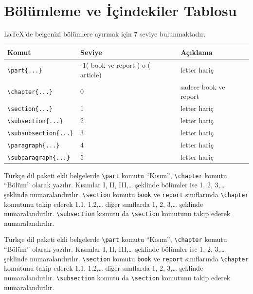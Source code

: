 \documentclass[
  10pt,
]{scrbook}
\theoremstyle{definition}
\theoremstyle{definition}
\theoremstyle{definition}
\theoremstyle{definition}
\theoremstyle{remark}
\begin{document}
\hypertarget{buxf6luxfcmleme-ve-iuxe7indekiler-tablosu}{%
\section{Bölümleme ve İçindekiler Tablosu}\label{buxf6luxfcmleme-ve-iuxe7indekiler-tablosu}}

LaTeX'de belgenizi bölümlere ayırmak için 7 seviye bulunmaktadır.

\begin{longtable}[]{@{}lll@{}}
\toprule
Komut & Seviye & Açıklama \\
\midrule
\endhead
\texttt{\textbackslash{}part\{...\}} & -1( book ve report ) o ( article) & letter hariç \\
\texttt{\textbackslash{}chapter\{...\}} & 0 & sadece book ve report \\
\texttt{\textbackslash{}section\{...\}} & 1 & letter hariç \\
\texttt{\textbackslash{}subsection\{...\}} & 2 & letter hariç \\
\texttt{\textbackslash{}subsubsection\{...\}} & 3 & letter hariç \\
\texttt{\textbackslash{}paragraph\{...\}} & 4 & letter hariç \\
\texttt{\textbackslash{}subparagraph\{...\}} & 5 & letter hariç \\
\bottomrule
\end{longtable}

Türkçe dil paketi ekli belgelerde \texttt{\textbackslash{}part} komutu ``Kısım'', \texttt{\textbackslash{}chapter} komutu ``Bölüm'' olarak yazılır. Kısımlar I, II, III,\ldots{} şeklinde bölümler ise 1, 2, 3,\ldots{} şeklinde numaralandırılır. \texttt{\textbackslash{}section} komutu \texttt{book} ve \texttt{report} sınıflarında \texttt{\textbackslash{}chapter} komutunu takip ederek 1.1, 1.2,\ldots{} diğer sınıflarda 1, 2, 3,\ldots{} şeklinde numaralandırılır. \texttt{\textbackslash{}subsection} komutu da \texttt{\textbackslash{}section} komutunu takip ederek numaralandırılır.

Türkçe dil paketi ekli belgelerde \texttt{\textbackslash{}part} komutu ``Kısım'', \texttt{\textbackslash{}chapter} komutu ``Bölüm'' olarak yazılır. Kısımlar I, II, III,\ldots{} şeklinde bölümler ise 1, 2, 3,\ldots{} şeklinde numaralandırılır. \texttt{\textbackslash{}section} komutu \texttt{book} ve \texttt{report} sınıflarında \texttt{\textbackslash{}chapter} komutunu takip ederek 1.1, 1.2,\ldots{} diğer sınıflarda 1, 2, 3,\ldots{} şeklinde numaralandırılır. \texttt{\textbackslash{}subsection} komutu da \texttt{\textbackslash{}section} komutunu takip ederek numaralandırılır.
\end{document}
